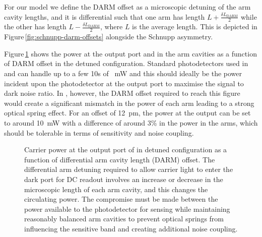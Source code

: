 For our model we define the \gls{DARM} offset as a microscopic detuning of the arm cavity lengths, and it is differential such that one arm has length $L + \frac{\delta L_{\text{DARM}}}{2}$ while the other has length $L - \frac{\delta L_{\text{DARM}}}{2}$, where $L$ is the average length. This is depicted in Figure\,\ref{fig:schnupp-darm-offsets} alongside the Schnupp asymmetry.

Figure\,\ref{fig:total-power-vs-darm-offset-detuned} shows the power at the output port and in the arm cavities as a function of \gls{DARM} offset in the detuned configuration. Standard photodetectors used in \ALIGO{} and \AVIRGO{} can handle up to a few \num{10}s of \SI{}{\milli\watt} and this should ideally be the power incident upon the photodetector at the output port to maximise the signal to dark noise ratio. In \ETLF{}, however, the \gls{DARM} offset required to reach this figure would create a significant mismatch in the power of each arm leading to a strong optical spring effect. For an offset of \SI{12}{\pico\meter}, the power at the output can be set to around \SI{10}{\milli\watt} with a difference of around 3\% in the power in the arms, which should be tolerable in terms of sensitivity and noise coupling.

\begin{figure}
  \centering
  
  \caption[Carrier power at the output port of \ETLF{} in detuned configuration as a function of differential arm cavity offset]{\label{fig:total-power-vs-darm-offset-detuned}Carrier power at the output port of \ETLF{} in detuned configuration as a function of differential arm cavity length (\gls{DARM}) offset. The differential arm detuning required to allow carrier light to enter the dark port for \gls{DC} readout involves an increase or decrease in the microscopic length of each arm cavity, and this changes the circulating power. The compromise must be made between the power available to the photodetector for sensing while maintaining reasonably balanced arm cavities to prevent optical springs from influencing the sensitive band and creating additional noise coupling.}
\end{figure}

